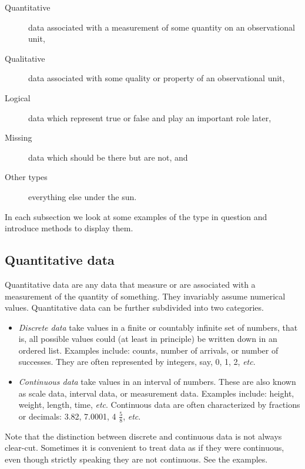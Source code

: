 \documentclass[10pt,english]{scrbook}
\begin{document}
\begin{description}
\item[Quantitative] data associated with a measurement of some quantity on an observational unit,
\item[Qualitative] data associated with some quality or property of an observational unit,
\item[Logical] data which represent true or false and play an important role later,
\item[Missing] data which should be there but are not, and
\item[Other types] everything else under the sun.
\end{description}

In each subsection we look at some examples of the type in question and introduce methods to display them.

\subsection[Quantitative data]{Quantitative data}
\label{sec-1-1-1}

Quantitative data are any data that measure or are associated with a measurement of the quantity of something. They invariably assume numerical values. Quantitative data can be further subdivided into two categories. 

\begin{itemize}
\item \emph{Discrete data} take values in a finite or countably infinite set of numbers, that is, all possible values could (at least in principle) be written down in an ordered list. Examples include: counts, number of arrivals, or number of successes. They are often represented by integers, say, 0, 1, 2, \emph{etc}.
\item \emph{Continuous data} take values in an interval of numbers. These are also known as scale data, interval data, or measurement data. Examples include: height, weight, length, time, \emph{etc}. Continuous data are often characterized by fractions or decimals: 3.82, 7.0001, 4 \(\frac{5}{8}\), \emph{etc}.
\end{itemize}

Note that the distinction between discrete and continuous data is not always clear-cut. Sometimes it is convenient to treat data as if they were continuous, even though strictly speaking they are not continuous. See the examples.
\end{document}
